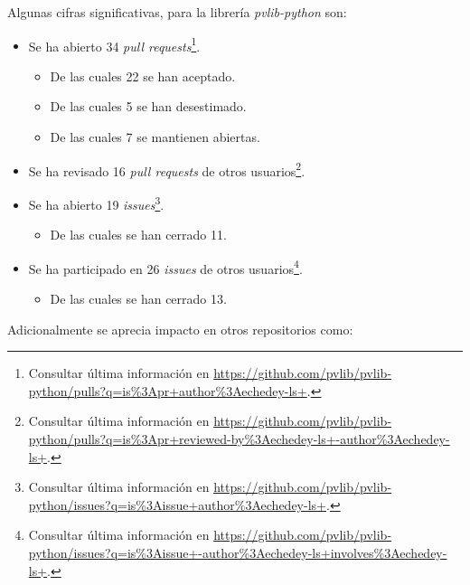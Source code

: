 Algunas cifras significativas, para la librería \textit{pvlib-python} son:

\begin{itemize}
    \item Se ha abierto 34 \textit{pull requests}\footnote{Consultar última información en \url{https://github.com/pvlib/pvlib-python/pulls?q=is\%3Apr+author\%3Aechedey-ls+}.}.
    \begin{itemize}
        \item De las cuales 22 se han aceptado.
        \item De las cuales 5 se han desestimado.
        \item De las cuales 7 se mantienen abiertas.
    \end{itemize}
    \item Se ha revisado 16 \textit{pull requests} de otros usuarios\footnote{Consultar última información en \url{https://github.com/pvlib/pvlib-python/pulls?q=is\%3Apr+reviewed-by\%3Aechedey-ls+-author\%3Aechedey-ls+}.}.
    \item Se ha abierto 19 \textit{issues}\footnote{Consultar última información en \url{https://github.com/pvlib/pvlib-python/issues?q=is\%3Aissue+author\%3Aechedey-ls+}.}.
    \begin{itemize}
        \item De las cuales se han cerrado 11.
    \end{itemize}
    \item Se ha participado en 26 \textit{issues} de otros usuarios\footnote{Consultar última información en \url{https://github.com/pvlib/pvlib-python/issues?q=is\%3Aissue+-author\%3Aechedey-ls+involves\%3Aechedey-ls+}.}.
    \begin{itemize}
        \item De las cuales se han cerrado 13.
    \end{itemize}
\end{itemize}

Adicionalmente se aprecia impacto en otros repositorios como:

